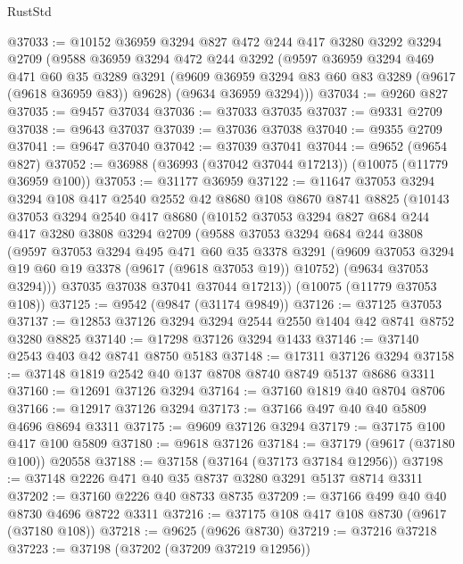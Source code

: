 \begin{lexlean}{RustStd}
\begin{coremodule}
@37033 := @10152
    @36959
    @3294
    @827
    @472
    @244
    @417
    @3280
    @3292
    @3294
    @2709
    (@9588
      @36959
      @3294
      @472
      @244
      @3292
      (@9597
        @36959
        @3294
        @469
        @471
        @60
        @35
        @3289
        @3291
        (@9609 @36959 @3294 @83 @60 @83 @3289 (@9617 (@9618 @36959 @83)) @9628)
        (@9634 @36959 @3294)))
@37034 := @9260 @827
@37035 := @9457 @37034
@37036 := @37033 @37035
@37037 := @9331 @2709
@37038 := @9643 @37037
@37039 := @37036 @37038
@37040 := @9355 @2709
@37041 := @9647 @37040
@37042 := @37039 @37041
@37044 := @9652 (@9654 @827)
@37052 := @36988 (@36993 (@37042 @37044 @17213)) (@10075 (@11779 @36959 @100))
@37053 := @31177 @36959
@37122 := @11647
    @37053
    @3294
    @3294
    @108
    @417
    @2540
    @2552
    @42
    @8680
    @108
    @8670
    @8741
    @8825
    (@10143
      @37053
      @3294
      @2540
      @417
      @8680
      (@10152
        @37053
        @3294
        @827
        @684
        @244
        @417
        @3280
        @3808
        @3294
        @2709
        (@9588
          @37053
          @3294
          @684
          @244
          @3808
          (@9597
            @37053
            @3294
            @495
            @471
            @60
            @35
            @3378
            @3291
            (@9609 @37053 @3294 @19 @60 @19 @3378 (@9617 (@9618 @37053 @19)) @10752)
            (@9634 @37053 @3294)))
        @37035
        @37038
        @37041
        @37044
        @17213))
    (@10075 (@11779 @37053 @108))
@37125 := @9542 (@9847 (@31174 @9849))
@37126 := @37125 @37053
@37137 := @12853 @37126 @3294 @3294 @2544 @2550 @1404 @42 @8741 @8752 @3280 @8825
@37140 := @17298 @37126 @3294 @1433
@37146 := @37140 @2543 @403 @42 @8741 @8750 @5183
@37148 := @17311 @37126 @3294
@37158 := @37148 @1819 @2542 @40 @137 @8708 @8740 @8749 @5137 @8686 @3311
@37160 := @12691 @37126 @3294
@37164 := @37160 @1819 @40 @8704 @8706
@37166 := @12917 @37126 @3294
@37173 := @37166 @497 @40 @40 @5809 @4696 @8694 @3311
@37175 := @9609 @37126 @3294
@37179 := @37175 @100 @417 @100 @5809
@37180 := @9618 @37126
@37184 := @37179 (@9617 (@37180 @100)) @20558
@37188 := @37158 (@37164 (@37173 @37184 @12956))
@37198 := @37148 @2226 @471 @40 @35 @8737 @3280 @3291 @5137 @8714 @3311
@37202 := @37160 @2226 @40 @8733 @8735
@37209 := @37166 @499 @40 @40 @8730 @4696 @8722 @3311
@37216 := @37175 @108 @417 @108 @8730 (@9617 (@37180 @108))
@37218 := @9625 (@9626 @8730)
@37219 := @37216 @37218
@37223 := @37198 (@37202 (@37209 @37219 @12956))

\end{coremodule}
\end{lexlean}
